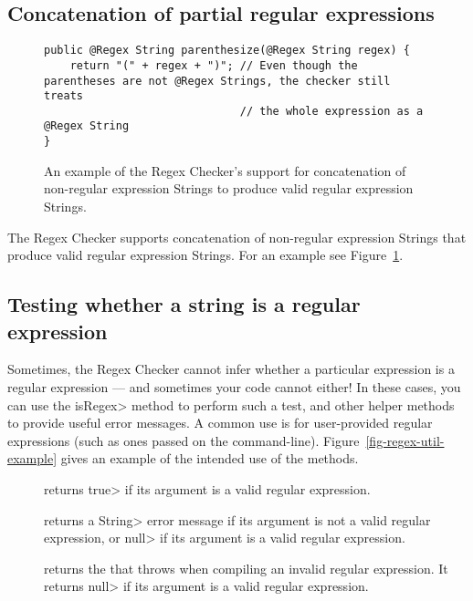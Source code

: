 \subsection{Concatenation of partial regular expressions\label{regex-partial-regex}}

\begin{figure}
\begin{Verbatim}
public @Regex String parenthesize(@Regex String regex) {
    return "(" + regex + ")"; // Even though the parentheses are not @Regex Strings, the checker still treats
                              // the whole expression as a @Regex String
}
\end{Verbatim}
\caption{An example of the Regex Checker's support for concatenation
of non-regular expression Strings to produce valid regular expression Strings.}
\label{fig-regex-partial}
\end{figure}

The Regex Checker supports concatenation of non-regular expression Strings
that produce valid regular expression Strings. For an example see
Figure~\ref{fig-regex-partial}.


\subsection{Testing whether a string is a regular expression\label{regexutil-methods}}

Sometimes, the Regex Checker cannot infer whether a particular expression
is a regular expression --- and sometimes your code cannot either!  In
these cases, you can use the \<isRegex> method to perform such a test, and
other helper methods to provide useful error messages.  A
common use is for user-provided regular expressions (such as ones passed
on the command-line).
Figure~\ref{fig-regex-util-example} gives an
example of the intended use of the  methods.

\begin{description}

\item[]
  returns \<true> if its argument is a valid regular expression.

\item[]
  returns a \<String> error message if its argument is not a valid regular
  expression, or \<null> if its argument is a valid regular expression.

\item[]
  returns the
  that 
  throws when compiling an invalid regular expression.  It returns \<null>
  if its argument is a valid regular expression.

\end{description}

